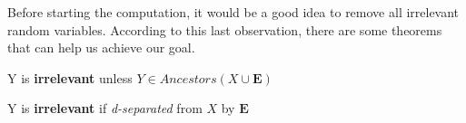 Before starting the computation, it would be a good idea to remove all irrelevant random variables. According to this last observation,
there are some theorems that can help us achieve our goal.
\begin{definition}[title={Theorem}]
    Y is \textbf{irrelevant} unless $Y \in Ancestors({X} \cup \mathbf{E})$
\end{definition}
\begin{definition}[title={Theorem}]
    Y is \textbf{irrelevant} if \textit{d-separated} from $X$ by $\mathbf{E}$
\end{definition}
\begin{example}
    
\end{example}